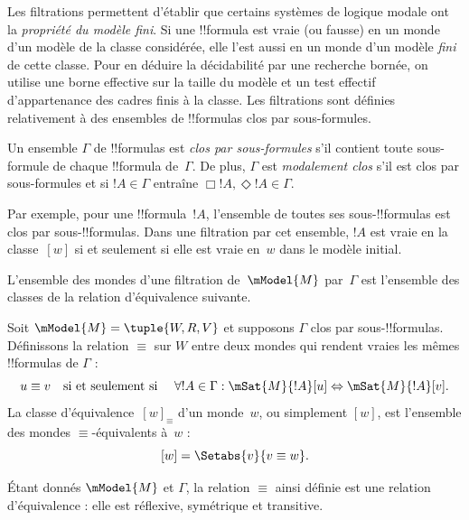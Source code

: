 \documentclass[../../../include/open-logic-section]{subfiles}
\begin{document}


Les filtrations permettent d'établir que certains systèmes de logique
modale ont la \emph{propriété du modèle fini}. Si une !!{formula} est vraie
(ou fausse) en un monde d'un modèle de la classe considérée, elle l'est
aussi en un monde d'un modèle \emph{fini} de cette classe. Pour en déduire
la décidabilité par une recherche bornée, on utilise une borne effective
sur la taille du modèle et un test effectif d'appartenance des cadres
finis à la classe. Les filtrations sont
définies relativement à des ensembles de !!{formula}s clos par
sous-formules.

\begin{defn}
  Un ensemble $\Gamma$ de !!{formula}s est \emph{clos par sous-formules}
  s'il contient toute sous-formule de chaque !!{formula} de~$\Gamma$.
  De plus, $\Gamma$ est \emph{modalement clos} s'il est clos par
  sous-formules et si $!A \in \Gamma$ entraîne $\Box!A,
  \Diamond!A \in \Gamma$.
\end{defn}

Par exemple, pour une !!{formula}~$!A$, l'ensemble de toutes ses
sous-!!{formula}s est clos par sous-!!{formula}s. Dans une filtration
par cet ensemble, $!A$ est vraie en la classe~$[w]$ si et seulement si
elle est vraie en~$w$ dans le modèle initial.

L'ensemble des mondes d'une filtration de~$\mModel{M}$ par~$\Gamma$
est l'ensemble des classes de la relation d'équivalence suivante.

\begin{defn}
Soit $\mModel{M} =\tuple{W, R, V}$ et supposons $\Gamma$ clos par
sous-!!{formula}s. Définissons la relation $\equiv$ sur $W$ entre deux
mondes qui rendent vraies les mêmes !!{formula}s de $\Gamma$ :
\[
u \equiv v \quad \text{si et seulement si } \quad
\forall !A \in \Gamma : \mSat{M}{!A}[u] \Leftrightarrow \mSat{M}{!A}[v].
\]
La classe d'équivalence~$[w]_\equiv$ d'un monde~$w$, ou simplement
$[w]$, est l'ensemble des mondes $\equiv$-équivalents à~$w$ :
\[
[w] = \Setabs{v}{v \equiv w}.
\]
\end{defn}

\begin{prop}
  Étant donnés $\mModel{M}$ et $\Gamma$, la relation $\equiv$ ainsi
  définie est une relation d'équivalence : elle est réflexive,
  symétrique et transitive.
\end{prop}
\end{document}
